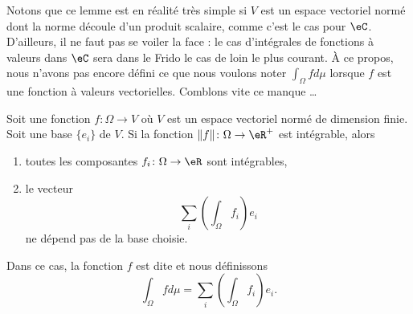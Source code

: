 Notons que ce lemme est en réalité très simple si \( V\) est un espace vectoriel normé dont la norme découle d'un produit scalaire, comme c'est le cas pour \( \eC\). D'ailleurs, il ne faut pas se voiler la face : le cas d'intégrales de fonctions à valeurs dans \( \eC\) sera dans le Frido le cas de loin le plus courant. À ce propos, nous n'avons pas encore défini ce que nous voulons noter \( \int_{\Omega}fd\mu\) lorsque \( f\) est une fonction à valeurs vectorielles. Comblons vite ce manque \ldots

\begin{propositionDef}       \label{PROPooOFSMooLhqOsc}
	Soit une fonction \( f\colon \Omega\to V\) où \( V\) est un espace vectoriel normé de dimension finie. Soit une base \( \{ e_i \}\) de \( V\).  Si la fonction \( \| f \|\colon \Omega\to \eR^+\) est intégrable, alors
	\begin{enumerate}
		\item
		      toutes les composantes \( f_i\colon \Omega\to \eR\) sont intégrables,
		\item
		      le vecteur
		      \begin{equation}        \label{EQooQCKMooZCbybq}
			      \sum_i(\int_{\Omega}f_i) e_i
		      \end{equation}
		      ne dépend pas de la base choisie.
	\end{enumerate}
	Dans ce cas, la fonction \( f\) est dite  et nous définissons
	\begin{equation}
		\int_{\Omega}fd\mu=\sum_i(\int_{\Omega}f_i) e_i.
	\end{equation}
\end{propositionDef}

